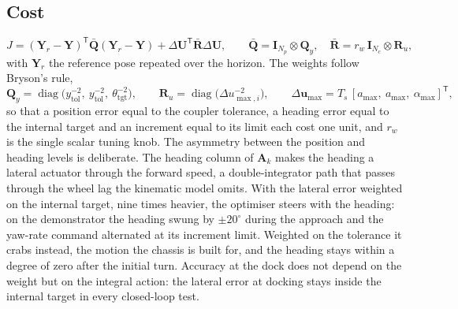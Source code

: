 \documentclass[11pt,a4paper]{article}
\newcommand{\vect}[1]{\bm{#1}}
\newcommand{\mat}[1]{\bm{#1}}
\newcommand{\T}{^{\mathsf{T}}}
\newcommand{\diag}{\operatorname{diag}}
\newcommand{\dU}{\Delta\vect{U}}
\newcommand{\Ts}{T_s}
\newcommand{\Np}{N_p}
\newcommand{\Nc}{N_c}
\newcommand{\Qbar}{\bar{\mat{Q}}}
\newcommand{\Rbar}{\bar{\mat{R}}}
\begin{document}
\subsection{Cost}
\begin{equation}
J = (\vect Y_r - \vect Y)\T\Qbar(\vect Y_r - \vect Y) + \dU\T\Rbar\dU,\qquad
\Qbar = \mat I_{\Np}\otimes\mat Q_y,\quad \Rbar = r_w\,\mat I_{\Nc}\otimes\mat R_u,
\label{eq:mpc-J}
\end{equation}
with $\vect Y_r$ the reference pose repeated over the horizon. The weights follow Bryson's rule,
\begin{equation}
\mat Q_y = \diag\big(y_{\mathrm{tol}}^{-2},\ y_{\mathrm{tol}}^{-2},\ \theta_{\mathrm{tgt}}^{-2}\big),\qquad
\mat R_u = \diag\big(\Delta u_{\max,i}^{-2}\big),\qquad
\Delta\vect u_{\max} = \Ts\,[a_{\max},\ a_{\max},\ \alpha_{\max}]\T,
\label{eq:mpc-weights}
\end{equation}
so that a position error equal to the coupler tolerance, a heading error equal to the internal target and an increment equal to its limit each cost one unit, and $r_w$ is the single scalar tuning knob. The asymmetry between the position and heading levels is deliberate. The heading column of $\mat A_k$ makes the heading a lateral actuator through the forward speed, a double-integrator path that passes through the wheel lag the kinematic model omits. With the lateral error weighted on the internal target, nine times heavier, the optimiser steers with the heading: on the demonstrator the heading swung by $\pm 20^\circ$ during the approach and the yaw-rate command alternated at its increment limit. Weighted on the tolerance it crabs instead, the motion the chassis is built for, and the heading stays within a degree of zero after the initial turn. Accuracy at the dock does not depend on the weight but on the integral action: the lateral error at docking stays inside the internal target in every closed-loop test.
\end{document}
